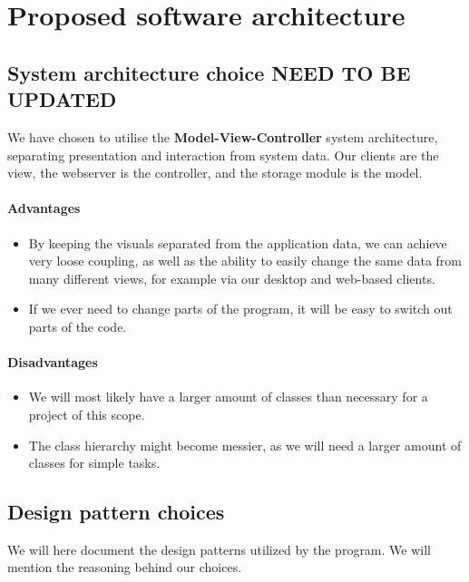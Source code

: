 \section{Proposed software architecture}
\label{sec:Proposed software architecture}






\subsection{System architecture choice NEED TO BE UPDATED}
We have chosen to utilise the \textbf{Model-View-Controller} system architecture, separating presentation and interaction from system data. Our clients are the view, the webserver is the controller, and the storage module is the model.

\paragraph{Advantages}
\begin{itemize}
	\item By keeping the visuals separated from the application data, we can achieve very loose coupling, as well as the ability to easily change the same data from many different views, for example via our desktop and web-based clients. \\
	\item If we ever need to change parts of the program, it will be easy to switch out parts of the code.
\end{itemize}


\paragraph{Disadvantages}
\begin{itemize}
	\item We will most likely have a larger amount of classes than necessary for a project of this scope. \\
	\item The class hierarchy might become messier, as we will need a larger amount of classes for simple tasks.
\end{itemize}

\subsection{Design pattern choices}
We will here document the design patterns utilized by the program. We will mention the reasoning behind our choices.

